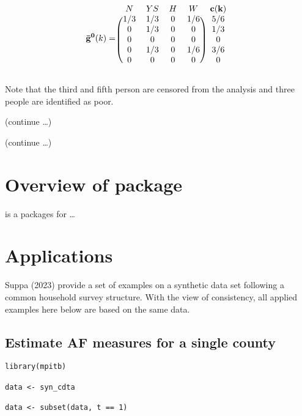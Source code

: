 \[ \mathbf{\bar{g}^0}(k) = 
\begin{blockarray}{ccccc}
N & YS & H & W & \bf{c(k)}\\
\begin{block}{(cccc)c}
  1/3 & 1/3 & 0 & 1/6 & 5/6\\
  0 & 1/3 & 0 & 0 & 1/3\\
  0 & 0 & 0 & 0 & 0\\
  0 & 1/3 & 0 & 1/6 & 3/6\\
  0 & 0 & 0 & 0 & 0\\
\end{block}
\end{blockarray}
\]

Note that the third and fifth person are censored from the analysis and three people are identified as poor.

(continue \ldots)

(continue \ldots)

\hypertarget{overview-of-package}{%
\section{\texorpdfstring{Overview of  package}{Overview of  package}}\label{overview-of-package}}

 is a packages for \ldots{}

\hypertarget{applications}{%
\section{Applications}\label{applications}}

Suppa (2023) provide a set of examples on a synthetic data set following a common household survey structure. With the view of consistency, all applied examples here below are based on the same data.

\hypertarget{estimate-af-measures-for-a-single-county}{%
\subsection{Estimate AF measures for a single county}\label{estimate-af-measures-for-a-single-county}}

\begin{verbatim}
library(mpitb)

data <- syn_cdta

data <- subset(data, t == 1)
\end{verbatim}


